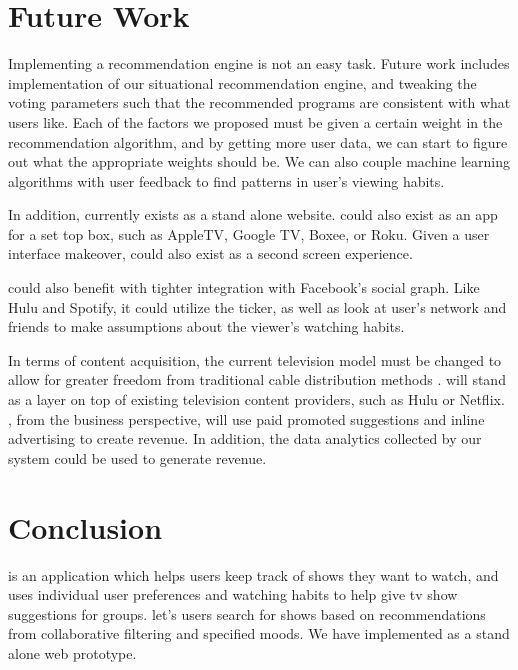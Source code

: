 \section{Future Work}
Implementing a recommendation engine is not an easy task.  Future work
includes implementation of our situational recommendation engine, and
tweaking the voting parameters such that the recommended programs are
consistent with what users like.  Each of the factors we proposed must
be given a certain weight in the recommendation algorithm, and by
getting more user data, we can start to figure out what the
appropriate weights should be.  We can also couple machine learning
algorithms with user feedback to find patterns in user's viewing
habits.

In addition, {\sys} currently exists as a stand alone website.  {\sys}
could also exist as an app for a set top box, such as AppleTV, Google
TV, Boxee, or Roku.  Given a user interface makeover, {\sys} could
also exist as a second screen experience.

{\sys} could also benefit with tighter integration with Facebook's
social graph.  Like Hulu and Spotify, it could utilize the ticker, as
well as look at user's network and friends to make assumptions about
the viewer’s watching habits.

In terms of content acquisition, the current television model must be
changed to allow for greater freedom from traditional cable
distribution methods \cite{montpetit}.  {\sys} will stand as a layer
on top of existing television content providers, such as Hulu or
Netflix.  {\sys}, from the business perspective, will use paid
promoted suggestions and inline advertising to create revenue.  In
addition, the data analytics collected by our system could be used to
generate revenue.

\section{Conclusion}

{\sys} is an application which helps users keep track of shows they
want to watch, and uses individual user preferences and watching
habits to help give tv show suggestions for groups.  {\sys} let's
users search for shows based on recommendations from collaborative
filtering and specified moods.  We have implemented {\sys} as a stand
alone web prototype.


